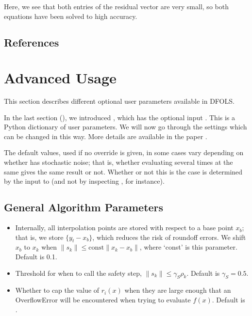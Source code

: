 \documentclass[letterpaper,10pt,english]{sphinxmanual}
\begin{document}
Here, we see that both entries of the residual vector are very small, so both equations have been solved to high accuracy.


\section{References}
\label{\detokenize{userguide:references}}

\chapter{Advanced Usage}
\label{\detokenize{advanced:advanced-usage}}\label{\detokenize{advanced::doc}}
This section describes different optional user parameters available in DFO\sphinxhyphen{}LS.

In the last section ({\hyperref[\detokenize{userguide::doc}]{}}), we introduced , which has the optional input . This is a Python dictionary of user parameters. We will now go through the settings which can be changed in this way. More details are available in the paper .

The default values, used if no override is given, in some cases vary depending on whether  has stochastic noise; that is, whether evaluating  several times at the same  gives the same result or not. Whether or not this is the case is determined by the  input to  (and not by inspecting , for instance).


\section{General Algorithm Parameters}
\label{\detokenize{advanced:general-algorithm-parameters}}\begin{itemize}
\item {} 
 \sphinxhyphen{} Internally, all interpolation points are stored with respect to a base point \(x_b\); that is, we store \(\{y_t-x_b\}\), which reduces the risk of roundoff errors. We shift \(x_b\) to \(x_k\) when \(\|s_k\| \leq \text{const}\|x_k-x_b\|\), where ‘const’ is this parameter. Default is 0.1.

\item {} 
 \sphinxhyphen{} Threshold for when to call the safety step, \(\|s_k\| \leq \gamma_S \rho_k\). Default is \(\gamma_S =0.5\).

\item {} 
 \sphinxhyphen{} Whether to cap the value of \(r_i(x)\) when they are large enough that an OverflowError will be encountered when trying to evaluate \(f(x)\). Default is .

\end{itemize}
\end{document}
